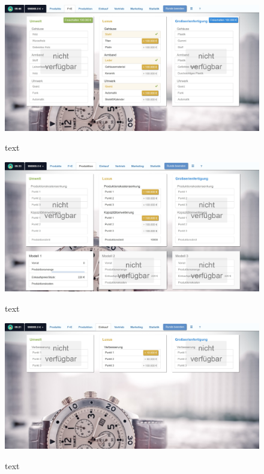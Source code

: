 \begin{figure} 
	\centering
	\includegraphics[scale=0.1]{img/bilder_layout/Spiel4.jpg}
	\label{key}
	\caption{text} 
\end{figure}
\begin{figure} 
	\centering
	\includegraphics[scale=0.1]{img/bilder_layout/Spiel5.jpg}
	\label{key}
	\caption{text} 
\end{figure}
\begin{figure} 
	\centering
	\includegraphics[scale=0.1]{img/bilder_layout/Spiel6.jpg}
	\label{key}
	\caption{text} 
\end{figure}
